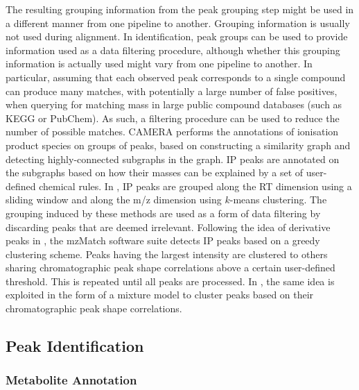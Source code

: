 The resulting grouping information from the peak grouping step might be used in a different manner from one pipeline to another. Grouping information is usually not used during alignment.  In identification, peak groups can be used to provide information used as a data filtering procedure, although whether this grouping information is actually used might vary from one pipeline to another. In particular, assuming that each observed peak corresponds to a single compound can produce many matches, with potentially a large number of false positives, when querying for matching mass in large public compound databases (such as KEGG or PubChem). As such, a filtering procedure can be used to reduce the number of possible matches. CAMERA \cite{Kuhl2012} performs the annotations of ionisation product species on groups of peaks, based on constructing a similarity graph and detecting highly-connected subgraphs in the graph. IP peaks are annotated on the subgraphs based on how their masses can be explained by a set of user-defined chemical rules. In \cite{Lee2013}, IP peaks are grouped along the RT dimension using a sliding window and along the m/z dimension using $k$-means clustering. The grouping induced by these methods are used as a form of data filtering by discarding peaks that are deemed irrelevant.  Following the idea of derivative peaks in \cite{Scheltema2009a}, the mzMatch software suite \cite{Scheltema2011} detects IP peaks based on a greedy clustering scheme. Peaks having the largest intensity are clustered to others sharing chromatographic peak shape correlations above a certain user-defined threshold. This is repeated until all peaks are processed. In \cite{Rogers2012}, the same idea is exploited in the form of a mixture model to cluster peaks based on their chromatographic peak shape correlations. 


\subsection{Peak Identification\label{sub:identification-background}}

\subsubsection{Metabolite Annotation}


